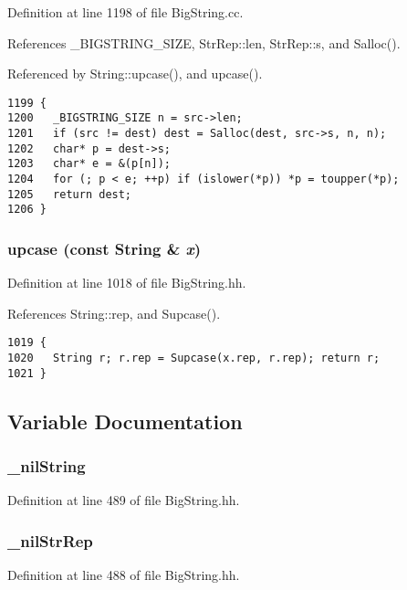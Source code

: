 Definition at line 1198 of file Big\-String.cc.

References \_\-BIGSTRING\_\-SIZE, Str\-Rep::len, Str\-Rep::s, and Salloc().

Referenced by String::upcase(), and upcase().



\footnotesize\begin{verbatim}1199 {
1200   _BIGSTRING_SIZE n = src->len;
1201   if (src != dest) dest = Salloc(dest, src->s, n, n);
1202   char* p = dest->s;
1203   char* e = &(p[n]);
1204   for (; p < e; ++p) if (islower(*p)) *p = toupper(*p);
1205   return dest;
1206 }
\end{verbatim}\normalsize 
{}
\subsubsection{ upcase (const {\bf String} \& {\em x})\hspace{0.3cm}{\tt  [inline]}}\label{BigString_8hh_a82}




Definition at line 1018 of file Big\-String.hh.

References String::rep, and Supcase().



\footnotesize\begin{verbatim}1019 {
1020   String r; r.rep = Supcase(x.rep, r.rep); return r;
1021 }
\end{verbatim}\normalsize 


\subsection{Variable Documentation}
\subsubsection{ \_\-nil\-String}\label{BigString_8hh_a15}




Definition at line 489 of file Big\-String.hh.
\subsubsection{ \_\-nil\-Str\-Rep}\label{BigString_8hh_a14}




Definition at line 488 of file Big\-String.hh.